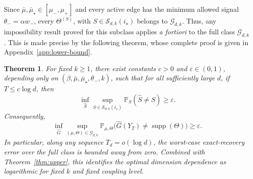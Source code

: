 \documentclass{article}
\newtheorem{theorem}{Theorem}[section]
\newcommand{\thetalo}{\theta_-}
\newcommand{\Pbb}{\mathbb{P}}
\newcommand{\supp}{\operatorname{supp}}
\begin{document}
Since $\bar\mu,\bar\mu_\star\in[\mu_-,\mu_+]$ and every active edge has the minimum allowed signal $\thetalo=\alpha w_-$, every $\Theta^{(S)}$, with $S\in\mathcal S_{d,k}(i_\star)$ belongs to $\mathcal G_{d,k}$. Thus, any impossibility result proved for this subclass applies \emph{a fortiori} to the full class $\mathcal G_{d,k}$. This is made precise by the following theorem, whose complete proof is given in Appendix~\ref{app:lower-bound}.

\begin{theorem}\label{thm:lower-bound}
For fixed $k\ge1$, there exist constants $c>0$ and
$\varepsilon\in(0,1)$, depending only on
$(\beta,\bar\mu,\bar\mu_\star,\thetalo,k)$, such that for all sufficiently
large $d$, if $T\le c\log d$, then
\[
\inf_{\widehat S}
\sup_{S\in\mathcal S_{d,k}(i_\star)}
\Pbb_S(\widehat S\neq S)
\ge \varepsilon .
\]
Consequently,
\[
\inf_{\widehat G}
\sup_{(\mu,\Theta)\in\mathcal G_{d,k}}
\Pbb_{\mu,\Theta}
\bigl(\widehat G(Y_T)\neq \supp(\Theta)\bigr)
\ge \varepsilon.
\]
In particular, along any sequence $T_d=o(\log d)$, the worst-case
exact-recovery error over the full class is bounded away from zero. 
Combined with Theorem~\ref{thm:upper}, this identifies the optimal dimension dependence as logarithmic for fixed $k$ and fixed coupling level.
\end{theorem}
\end{document}
